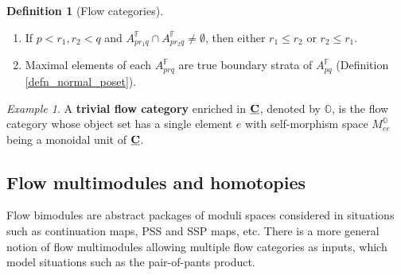 \documentclass[reqno, 10pt]{amsart}
\numberwithin{equation}{section}
\numberwithin{equation}{section}
\theoremstyle{definition}
\newtheorem{defn}[thm]{Definition}
\theoremstyle{remark}
\newtheorem{example}[thm]{Example}
\newcommand{\mb}{\mathbb}
\newcommand{\uds}[1]{\underline{\smash{#1}}}
\begin{document}
\begin{defn}[Flow categories]
\begin{enumerate}
\item If $p<r_1, r_2 < q$ and $A_{pr_1 q}^{\mb F} \cap A_{pr_2 q}^{\mb F} \neq \emptyset$, then either $r_1 \leq r_2$ or $r_2 \leq r_1$.



\item Maximal elements of each $A_{prq}^{\mb F}$ are true boundary strata of $A_{pq}^{\mb F}$ (Definition \ref{defn_normal_poset}). 
\end{enumerate}
\end{defn}



\begin{example}
A {\bf trivial flow category} enriched in $\uds{\bf C}$, denoted by ${\mb O}$, is the flow category whose object set has a single element $e$ with self-morphism space $M_{ee}^{{\mb O}}$ being a monoidal unit of $\uds{\bf C}$.
\end{example}







\subsection{Flow multimodules and homotopies}

Flow bimodules are abstract packages of moduli spaces considered in situations such as continuation maps, PSS and SSP maps, etc. There is a more general notion of flow multimodules allowing multiple flow categories as inputs, which model situations such as the pair-of-pants product. 
\end{document}
